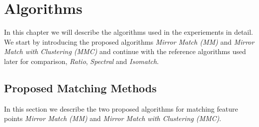 \chapter{Algorithms}
\label{C:Algorithms}

In this chapter we will describe the algorithms used in the experiements
in detail. We start by introducing the proposed algorithms \emph{Mirror 
Match (MM)} and \emph{Mirror Match with Clustering (MMC)} and continue 
with the reference algorithms used later for comparison, \emph{Ratio}, 
\emph{Spectral} and \emph{Isomatch}.
%
\section{Proposed Matching Methods}
\label{S:MatchingMethods}
In this section we describe the two proposed algorithms for matching 
feature points \emph{Mirror Match
(MM)} and \emph{Mirror Match with Clustering (MMC)}. 
%
